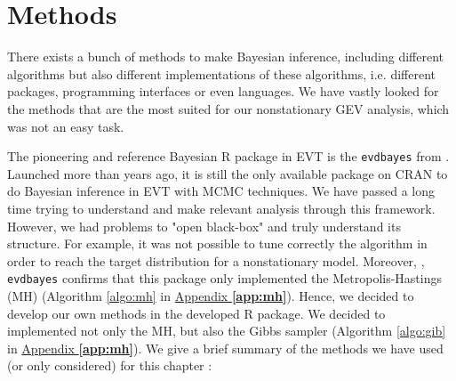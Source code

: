 \section{Methods }


There exists a bunch of methods to make Bayesian inference, including different algorithms but also different implementations of these algorithms, i.e. different packages, programming interfaces or even languages. We have vastly looked for the methods that are the most suited for our nonstationary GEV analysis, which was not an easy task.

The pioneering and reference Bayesian R package in EVT is the \texttt{evdbayes} from \citet{ribatet_users_2006}. Launched more than years ago, it is still the only available package on CRAN to do Bayesian inference in EVT with MCMC techniques. We have passed a long time trying to understand and make relevant analysis through this framework. However, we had problems to "open black-box" and truly understand its structure. For example, it was not possible to tune correctly the algorithm in order to reach the target distribution for a nonstationary model. Moreover, \citet{hartmann_bayesian_2016}, \texttt{evdbayes} confirms that this package only implemented the Metropolis-Hastings (MH) (Algorithm \ref{algo:mh} in \hyperref[app:mh]{Appendix \textbf{\ref{app:mh}}}).
Hence, we decided to develop our own methods in the developed R package. We decided to implemented not only the MH,  but also the Gibbs sampler (Algorithm \ref{algo:gib} in \hyperref[app:mh]{Appendix \textbf{\ref{app:mh}}}).
 We give a brief summary of the methods we have used (or only considered) for this chapter : 
 
